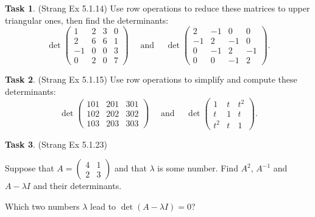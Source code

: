 \documentclass[10pt,]{book}
\theoremstyle{plain}
\theoremstyle{definition}
\numberwithin{equation}{section}
\newtheorem{task}{Task}[chapter]
\begin{document}
\begin{task}
\label{task-149}
(Strang Ex 5.1.14)
        Use row operations to reduce these matrices to upper triangular ones, then find
        the determinants:
        \[
          \det\begin{pmatrix} 1 & 2 & 3 & 0 \\ 2 & 6 & 6 & 1 \\ -1 & 0 & 0 & 3 \\
          0 & 2 & 0 & 7 \end{pmatrix} \quad \text{ and } \quad
          \det\begin{pmatrix} 2 & -1 & 0 & 0 \\ -1 & 2 & -1 & 0 \\ 0 & -1 & 2 & -1 \\
          0 & 0 & -1 & 2 \end{pmatrix}.
        \]\end{task}
\begin{task}
\label{task-150}
(Strang Ex 5.1.15)
        Use row operations to simplify and compute these determinants:
        \[
          \det\begin{pmatrix} 101 & 201 & 301 \\
          102 & 202 & 302  \\ 103 & 203 & 303
          \end{pmatrix} \quad \text{ and } \quad
          \det\begin{pmatrix} 1 & t & t^2 \\ t & 1 & t \\
          t^2 & t & 1 \end{pmatrix}.
        \]\end{task}
\begin{task}
\label{task-151}
(Strang Ex 5.1.23)
        
          Suppose that \(A = \left( \begin{smallmatrix} 4 & 1 \\ 2 & 3
          \end{smallmatrix} \right)\) and that \(\lambda\) is some number.
          Find \(A^2\), \(A^{-1}\) and \(A-\lambda I\) and their determinants.
\par

          Which two numbers \(\lambda\) lead to \(\det(A-\lambda I) = 0\)?
\end{task}
\clearpage
\typeout{************************************************}
\typeout{************************************************}
\end{document}
